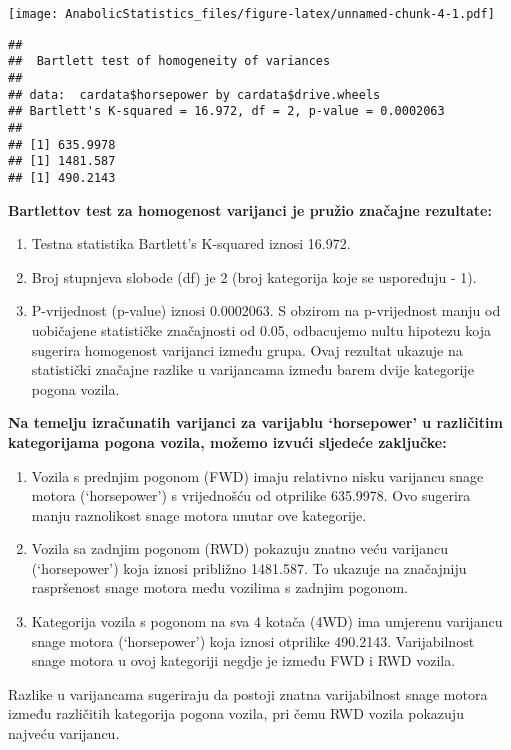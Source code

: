 \documentclass[
]{article}
\providecommand{\tightlist}{%
  \setlength{\itemsep}{0pt}\setlength{\parskip}{0pt}}
\begin{document}
\texttt{[image: AnabolicStatistics\_files/figure-latex/unnamed-chunk-4-1.pdf]}

\begin{verbatim}
## 
##  Bartlett test of homogeneity of variances
## 
## data:  cardata$horsepower by cardata$drive.wheels
## Bartlett's K-squared = 16.972, df = 2, p-value = 0.0002063
## 
## [1] 635.9978
## [1] 1481.587
## [1] 490.2143
\end{verbatim}

\textbf{Bartlettov test za homogenost varijanci je pružio značajne
rezultate:}

\begin{enumerate}
\def\labelenumi{\arabic{enumi}.}
\tightlist
\item
  Testna statistika Bartlett's K-squared iznosi 16.972.
\item
  Broj stupnjeva slobode (df) je 2 (broj kategorija koje se uspoređuju -
  1).
\item
  P-vrijednost (p-value) iznosi 0.0002063. S obzirom na p-vrijednost
  manju od uobičajene statističke značajnosti od 0.05, odbacujemo nultu
  hipotezu koja sugerira homogenost varijanci između grupa. Ovaj
  rezultat ukazuje na statistički značajne razlike u varijancama između
  barem dvije kategorije pogona vozila.
\end{enumerate}

\textbf{Na temelju izračunatih varijanci za varijablu `horsepower' u
različitim kategorijama pogona vozila, možemo izvući sljedeće
zaključke:}

\begin{enumerate}
\def\labelenumi{\arabic{enumi}.}
\tightlist
\item
  Vozila s prednjim pogonom (FWD) imaju relativno nisku varijancu snage
  motora (`horsepower') s vrijednošću od otprilike 635.9978. Ovo
  sugerira manju raznolikost snage motora unutar ove kategorije.
\item
  Vozila sa zadnjim pogonom (RWD) pokazuju znatno veću varijancu
  (`horsepower') koja iznosi približno 1481.587. To ukazuje na
  značajniju raspršenost snage motora među vozilima s zadnjim pogonom.
\item
  Kategorija vozila s pogonom na sva 4 kotača (4WD) ima umjerenu
  varijancu snage motora (`horsepower') koja iznosi otprilike 490.2143.
  Varijabilnost snage motora u ovoj kategoriji negdje je između FWD i
  RWD vozila.
\end{enumerate}

Razlike u varijancama sugeriraju da postoji znatna varijabilnost snage
motora između različitih kategorija pogona vozila, pri čemu RWD vozila
pokazuju najveću varijancu.
\end{document}
